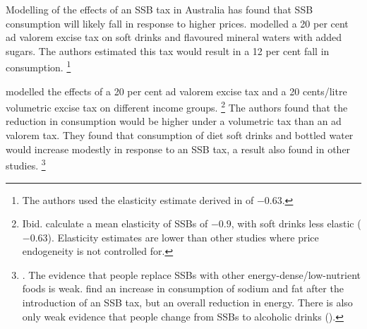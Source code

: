 \documentclass[embargoed]{grattan}
\begin{document}
Modelling of the effects of an SSB tax in Australia has found that SSB consumption will likely fall in response to higher prices. \textcite{Veerman2016ImpactTaxSugar} modelled a 20 per cent ad valorem excise tax on soft drinks and flavoured mineral waters with added sugars.
The authors estimated this tax would result in a 12 per cent fall in consumption.%
\footnote{The authors used the elasticity estimate derived in \textcite{Sharma2014effectstaxingsugarsweetened} of \(-0.63\).}

\textcite{Sharma2014effectstaxingsugarsweetened} modelled the effects of a 20 per cent ad valorem excise tax and a 20 cents/litre volumetric excise tax on different income groups.%
\footnote{Ibid. calculate a mean elasticity of SSBs of \(-0.9\), with soft drinks less elastic (\(-0.63\)).
Elasticity estimates are lower than other studies where price endogeneity is not controlled for.} The authors found that the reduction in consumption would be higher under a volumetric tax than an ad valorem tax.
They found that consumption of diet soft drinks and bottled water would increase modestly in response to an SSB tax, a result also found in other studies.%
\footnote{\textcites{Colchero2016Beveragepurchasesstores}{Briggs2013Overallincomespecific}{Falbe2015Higherretailprices}.
The evidence that people replace SSBs with other energy-dense/low-nutrient foods is weak. \textcite{Zhen2014Predictingeffectssugar} find an increase in consumption of sodium and fat after the introduction of an SSB tax, but an overall reduction in energy.
There is also only weak evidence that people change from SSBs to alcoholic drinks (\textcite{Wansink2014cokecoorsfield}).}
\end{document}
